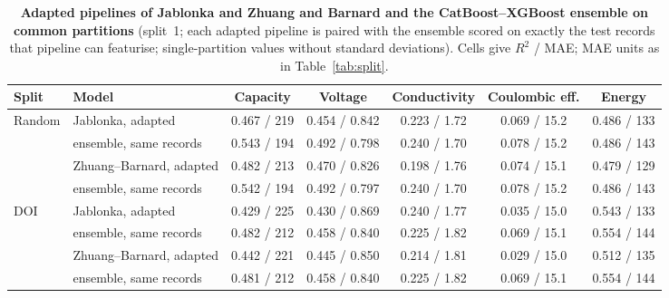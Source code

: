 \documentclass[3p]{elsarticle}
\begin{document}
\clearpage
\begin{table}[H]
    \centering\small
    \caption{\textbf{Adapted pipelines of Jablonka \cite{jablonka2026clever} and Zhuang and Barnard \cite{zhuang2024property} and the CatBoost--XGBoost ensemble on common partitions} (split~1; each adapted pipeline is paired with the ensemble scored on exactly the test records that pipeline can featurise; single-partition values without standard deviations). Cells give $R^2$ / MAE; MAE units as in Table~\ref{tab:split}.}
    \label{tab:adapted}
    \begin{tabular}{@{}llccccc@{}}
        \toprule
        Split & Model & Capacity & Voltage & Conductivity & Coulombic eff. & Energy \\
        \midrule
        Random & Jablonka, adapted & 0.467 / 219 & 0.454 / 0.842 & 0.223 / 1.72 & 0.069 / 15.2 & 0.486 / 133 \\
        & \quad ensemble, same records & 0.543 / 194 & 0.492 / 0.798 & 0.240 / 1.70 & 0.078 / 15.2 & 0.486 / 143 \\
        & Zhuang--Barnard, adapted & 0.482 / 213 & 0.470 / 0.826 & 0.198 / 1.76 & 0.074 / 15.1 & 0.479 / 129 \\
        & \quad ensemble, same records & 0.542 / 194 & 0.492 / 0.797 & 0.240 / 1.70 & 0.078 / 15.2 & 0.486 / 143 \\
        \midrule
        DOI    & Jablonka, adapted & 0.429 / 225 & 0.430 / 0.869 & 0.240 / 1.77 & 0.035 / 15.0 & 0.543 / 133 \\
        & \quad ensemble, same records & 0.482 / 212 & 0.458 / 0.840 & 0.225 / 1.82 & 0.069 / 15.1 & 0.554 / 144 \\
        & Zhuang--Barnard, adapted & 0.442 / 221 & 0.445 / 0.850 & 0.214 / 1.81 & 0.029 / 15.0 & 0.512 / 135 \\
        & \quad ensemble, same records & 0.481 / 212 & 0.458 / 0.840 & 0.225 / 1.82 & 0.069 / 15.1 & 0.554 / 144 \\
        \bottomrule
    \end{tabular}
\end{table}
\end{document}
